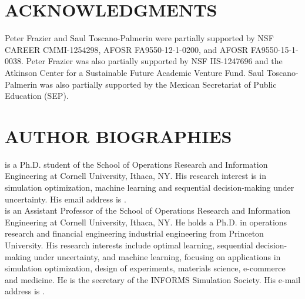 \documentclass{wscpaperproc}
\theoremstyle{wsc}
\begin{document}
\section*{ACKNOWLEDGMENTS}
Peter Frazier and Saul Toscano-Palmerin were partially supported by NSF CAREER CMMI-1254298, AFOSR FA9550-12-1-0200, and AFOSR FA9550-15-1-0038.
Peter Frazier was also partially supported by NSF IIS-1247696 and the Atkinson Center for a Sustainable Future Academic Venture Fund.
Saul Toscano-Palmerin was also partially supported by the Mexican Secretariat of Public Education (SEP).








\section*{AUTHOR BIOGRAPHIES}

 is a Ph.D. student of the School of Operations Research and Information Engineering at Cornell University, Ithaca, NY. His research interest is in simulation optimization, machine learning and sequential decision-making under uncertainty. His email address is . \\

 is an Assistant Professor of the School of Operations Research and Information Engineering at Cornell University, Ithaca, NY.  He holds a Ph.D. in operations research and financial engineering industrial engineering from Princeton University. His research interests include optimal learning, sequential decision-making under uncertainty, and machine learning, focusing on applications in simulation optimization, design of experiments, materials science, e-commerce and medicine. He is the secretary of the INFORMS Simulation Society.
His e-mail address is .\\
\end{document}
